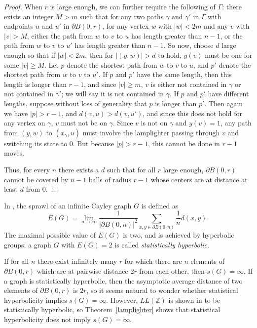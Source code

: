 \documentclass[11pt]{article}
\newcommand{\Z}{\mathbb{Z}}
\begin{document}
\begin{proof}
When $r$ is large enough, we can further require the following of $\Gamma$: there exists an integer $M>m$ such that for any two paths $\gamma$ and $\gamma'$ in $\Gamma$ with endpoints $u$ and $u'$ in $\partial B(0,r)$, for any vertex $w$ with $|w| < 2m$ and any $v$ with $|v|>M$, either the path from $w$ to $v$ to $u$ has length greater than $n-1$, or the path from $w$ to $v$ to $u'$ has length greater than $n-1$. So now, choose $d$ large enough so that if $|w| < 2m$, then for $|(y,w)|>d$ to hold, $y(v)$ must be one for some $|v| \geq M$. Let $p$ denote the shortest path from $w$ to $v$ to $u$, and $p'$ denote the shortest path from $w$ to $v$ to $u'$. If $p$ and $p'$ have the same length, then this length is longer than $r-1$, and since $|v| \geq m$, $v$ is either not contained in $\gamma$ or not contained in $\gamma'$; we will say it is not contained in $\gamma$. If $p$ and $p'$ have different lengths, suppose without loss of generality that $p$ is longer than $p'$. Then again we have $|p| > r-1$, and $d(v,u) > d(v,u')$, and since this does not hold for any vertex on $\gamma$, $v$ must not be on $\gamma$. Since $v$ is not on $\gamma$ and $y(v) = 1$, any path from $(y,w)$ to $(x_\gamma, u)$ must involve the lamplighter passing through $v$ and switching its state to 0. But because $|p| > r-1$, this cannot be done in $r-1$ moves.

Thus, for every $n$ there exists a $d$ such that for all $r$ large enough, $\partial B(0,r)$ cannot be covered by $n-1$ balls of radius $r-1$ whose centers are at distance at least $d$ from 0.

\end{proof}


In \cite{stathyp}, the sprawl of an infinite Cayley graph $G$ is defined as
$$E(G) = \lim_{n \rightarrow \infty} \frac{1}{|\partial B(0,n)|^2} \sum_{x,y \in \partial B(0,n)} \frac{1}{n}d(x,y).$$
The maximal possible value of $E(G)$ is two, and is achieved by hyperbolic groups; a graph $G$ with $E(G)= 2$ is called {\em statistically hyperbolic}. 

If for all $n$ there exist infinitely many $r$ for which there are $n$ elements of $\partial B(0,r)$ which are at pairwise distance $2r$ from each other, then $s(G) = \infty$. If a graph is statistically hyperbolic, then the asymptotic average distance of two elements of $\partial B(0,r)$ is $2r$, so it seems natural to wonder whether statistical hyperbolicity implies $s(G) = \infty$. However, $LL(\Z)$ is shown in \cite{stathyp} to be statistically hyperbolic, so Theorem~\ref{lamplighter} shows that statistical hyperbolicity does not imply $s(G) = \infty$. 
\end{document}
